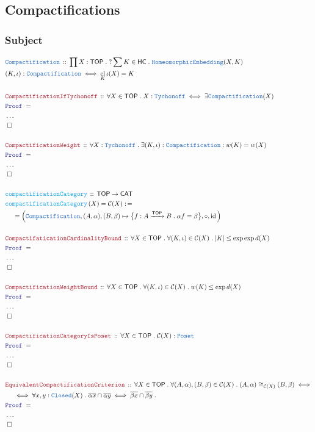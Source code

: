 \documentclass[12pt]{scrartcl}
\newcommand{\TYPE}[1]{\textcolor{NavyBlue}{\mathtt{#1}}}
\newcommand{\FUNC}[1]{\textcolor{Cerulean}{\mathtt{#1}}}
\newcommand{\LOGIC}[1]{\textcolor{Blue}{\mathtt{#1}}}
\newcommand{\THM}[1]{\textcolor{Maroon}{\mathtt{#1}}}
\renewcommand{\.}{\; . \;}
\newcommand{\de}{: \kern 0.1pc =}
\newcommand{\Act}[1]{\left( #1 \right)}
\newcommand{\Theorem}[2]{& \THM{#1} \, :: \, #2 \\ & \Proof = \\ }
\newcommand{\DeclareType}[2]{& \TYPE{#1} \, :: \, #2 \\}
\newcommand{\DefineType}[3]{& #1 : \TYPE{#2} \iff #3 \\}
\newcommand{\DeclareFunc}[2]{& \FUNC{#1} \, :: \, #2 \\}
\newcommand{\DefineNamedFunc}[4]{&  \FUNC{#1}\Act{#2} = #3 \de #4 \\}
\newcommand{\NewLine}{\\ & \kern 1pc}
\newcommand{\Page}[1]{ \begin{align*} #1 \end{align*}   }
\newcommand{\NoProof}{ & \ldots \\ \EndProof}
\DeclareMathOperator*{\id}{id}
\newcommand{\Arrow}{\xrightarrow}
\newcommand{\QED}{\; \square}
\newcommand{\EndProof}{& \QED \\}
\newcommand{\Proof}{\LOGIC{Proof} \; }
\renewcommand{\C}{\mathcal{C}}
\newcommand{\CAT}{\mathsf{CAT}}
\DeclareMathOperator*{\cl}{cl}
\newcommand{\TOP}{\mathsf{TOP}}
\newcommand{\HC}{\mathsf{HC}}
\begin{document}
\subsection{Compactifications}
\subsubsection{Subject}
\Page{
	\DeclareType{Compactification}
	{
		\prod X : \TOP \.  
		?\sum  K \in \HC \.
		\TYPE{HomeomorphicEmbedding}(X,K) 
	}
	\DefineType{(K,\iota)}{Compactification}{\cl_K \iota(X) = K}
	\\
	\Theorem{CompactificationIfTychonoff}
	{
		\forall  X \in \TOP \.
		X : \TYPE{Tychonoff} \iff 
		\exists \TYPE{Compactification}(X)
	}
	\NoProof
	\\
	\Theorem{CompactificationWeight}
	{
		\forall X : \TYPE{Tychonoff} \.
		\exists (K,\iota) : \TYPE{Compactification} :
		w(K) = w(X)
	}
	\NoProof
	\\
	\DeclareFunc{compactificationCategory}{ \TOP \to \CAT}
	\DefineNamedFunc{compactificationCategory}{X}{\C(X)} 
	{
		\NewLine = 
		\Big( \TYPE{Compactification},(A,\alpha),(B,\beta) \mapsto \big\{ f : A \Arrow{\TOP} B \. 
		\alpha f = \beta \big\}, \circ, \id \Big)
	}
	\\
	\Theorem{CompactifaticationCardinalityBound}
	{
		\forall X \in \TOP \. \forall (K,\iota) \in \C(X) \.  |K| \le \exp \exp d(X) 
	}
	\NoProof
	\\
	\Theorem{CompactificationWeightBound}
	{
		\forall X \in \TOP \. \forall (K,\iota) \in \C(X) \. w(K) \le \exp d(X)
	}
	\NoProof
	\\
	\Theorem{CompactificationCategoryIsPoset}{\forall X \in \TOP \. \C(X) : \TYPE{Poset}}
	\NoProof
	\\
	\Theorem{EquivalentCompactificationCriterion}
	{
		\forall X \in \TOP \. 
		\forall (A,\alpha), (B,\beta) \in \C(X) \.
		(A,\alpha) \cong_{\C(X)} (B,\beta) \iff \NewLine \iff
		\forall x,y : \TYPE{Closed}(X) \.
		\overline{\alpha x} \cap \overline{\alpha y} 
		\iff
		\overline{\beta x} \cap \overline{\beta y} \.
	}
	\NoProof
}
\end{document}
